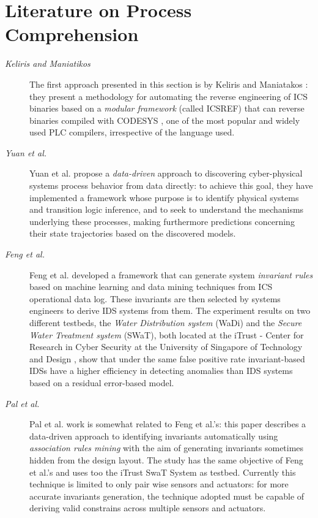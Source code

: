 \section{Literature on Process Comprehension}
\label{sec:3_related_work}
\begin{description}
	\item[\textit{Keliris and Maniatikos}] The first approach presented in this section is by Keliris and Maniatakos \cite{keliris_maniatakos}: they present a methodology for automating the reverse engineering of ICS binaries based on a \textit{modular framework} (called ICSREF) that can reverse binaries compiled with CODESYS \cite{codesys}, one of the most popular and widely used PLC compilers, irrespective of the language used.
	
	\item[\textit{Yuan et al.}] Yuan et al. \cite{yuan_et_al} propose a \textit{data-driven} approach to discovering cyber-physical systems process behavior from data directly: to achieve this goal, they have implemented a framework whose purpose is to identify physical systems and transition logic inference, and to seek to understand the mechanisms underlying these processes, making furthermore predictions concerning their state trajectories based on the discovered models.
	
	\item[\textit{Feng et al.}] Feng et al. \cite{feng_swat} developed a framework that can generate system \textit{invariant rules} based on machine learning and data mining techniques from ICS operational data log. These invariants are then selected by systems engineers to derive IDS systems from them.\newline
	The experiment results on two different testbeds, the \textit{Water Distribution system} (WaDi) and the \textit{Secure Water Treatment system} (SWaT), both located at the iTrust - Center for Research in Cyber Security at the University of Singapore of Technology and Design \cite{itrust_site}, show that under the same false positive rate invariant-based IDSs have a higher efficiency in detecting anomalies than IDS systems based on a residual error-based model. 
	
	\item[\textit{Pal et al.}] Pal et al. \cite{pal_et_al} work is somewhat related to Feng et al.'s: this paper describes a data-driven approach to identifying invariants automatically using \textit{association rules mining} \cite{association_rules_mining} with the aim of generating invariants sometimes hidden from the design layout. The study has the same objective of Feng et al.'s and uses too the iTrust SwaT System as testbed.\newline
	Currently this technique is limited to only pair wise sensors and actuators: for more accurate invariants generation, the technique adopted must be capable of deriving valid constrains across multiple sensors and actuators.
	

\end{description}

